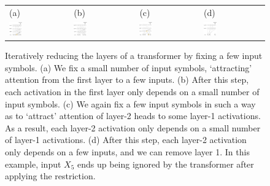 \documentclass[11pt,a4paper]{article}
\begin{document}






\begin{figure}[ht]
    \centering
    \begin{tabular}{llll}
    (a) & (b) & (c) & (d) \\
    \includegraphics[width=0.23\textwidth]{figures/sa1.png} &
        \includegraphics[width=0.23\textwidth]{figures/sa2.png}&
    \includegraphics[width=0.23\textwidth]{figures/sa3.png} &
        \includegraphics[width=0.23\textwidth]{figures/sa4.png}
        \end{tabular}
	\caption{Iteratively reducing the layers of a transformer by fixing a few input symbols. (a) We fix a small number of input symbols, `attracting' attention from the first layer to a few inputs. (b) After this step, each activation in the first layer only depends on a small number of input symbols. (c) We again fix a few input symbols in such a way as to `attract' attention of layer-2 heads to some layer-1 activations. As a result, each layer-2 activation only depends on a small number of layer-1 activations. (d) After this step, each layer-2 activation only depends on a few inputs, and we can remove layer 1. In this example, input $X_5$ ends up being ignored by the transformer after applying the restriction.}

\end{figure}
\end{document}

